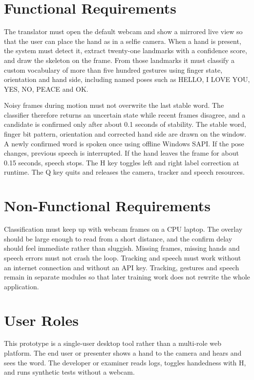 \section{Functional Requirements}
The translator must open the default webcam and show a mirrored live view so that the user can place the hand as in a selfie camera. When a hand is present, the system must detect it, extract twenty-one landmarks with a confidence score, and draw the skeleton on the frame. From those landmarks it must classify a custom vocabulary of more than five hundred gestures using finger state, orientation and hand side, including named poses such as HELLO, I LOVE YOU, YES, NO, PEACE and OK.

Noisy frames during motion must not overwrite the last stable word. The classifier therefore returns an uncertain state while recent frames disagree, and a candidate is confirmed only after about 0.1 seconds of stability. The stable word, finger bit pattern, orientation and corrected hand side are drawn on the window. A newly confirmed word is spoken once using offline Windows SAPI. If the pose changes, previous speech is interrupted. If the hand leaves the frame for about 0.15 seconds, speech stops. The H key toggles left and right label correction at runtime. The Q key quits and releases the camera, tracker and speech resources.

\section{Non-Functional Requirements}
Classification must keep up with webcam frames on a CPU laptop. The overlay should be large enough to read from a short distance, and the confirm delay should feel immediate rather than sluggish. Missing frames, missing hands and speech errors must not crash the loop. Tracking and speech must work without an internet connection and without an API key. Tracking, gestures and speech remain in separate modules so that later training work does not rewrite the whole application.

\section{User Roles}
This prototype is a single-user desktop tool rather than a multi-role web platform. The end user or presenter shows a hand to the camera and hears and sees the word. The developer or examiner reads logs, toggles handedness with H, and runs synthetic tests without a webcam.

